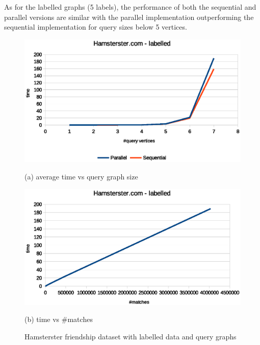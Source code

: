 As for the labelled graphs (5 labels), the performance of both the sequential and parallel versions are similar with the parallel implementation outperforming the sequential implementation for query sizes below 5 vertices.


\begin{figure}[H]
    \centering
    \begin{minipage}[b]{.45\textwidth}
        \hspace*{-0.5in}
        \includegraphics[scale=0.55]{images/hamsterster_labelled.eps}
        \caption*{(a) average time vs query graph size}        
    \end{minipage} \hfill  
    \begin{minipage}[b]{.45\textwidth}
        \hspace*{-0.2in}
        \includegraphics[scale=0.55]{images/hamsterster_labelled_tpm.eps}
        \caption*{(b) time vs \#matches}       
    \end{minipage}   
\caption{Hamsterster friendship dataset with labelled data and query graphs}
\label{fig:distmx}
\end{figure}

